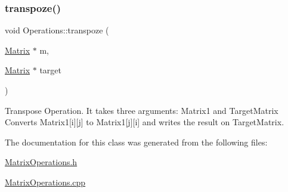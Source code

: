 \subsubsection{\texorpdfstring{transpoze()}{transpoze()}}
{\footnotesize\ttfamily void Operations\+::transpoze (\begin{DoxyParamCaption}\item[{\hyperlink{class_matrix}{Matrix} $\ast$}]{m,  }\item[{\hyperlink{class_matrix}{Matrix} $\ast$}]{target }\end{DoxyParamCaption})}

Transpose Operation. It takes three arguments\+: Matrix1 and Target\+Matrix Converts Matrix1\mbox{[}i\mbox{]}\mbox{[}j\mbox{]} to Matrix1\mbox{[}j\mbox{]}\mbox{[}i\mbox{]} and writes the result on Target\+Matrix. 

The documentation for this class was generated from the following files\+:\begin{DoxyCompactItemize}
\item 
\hyperlink{_matrix_operations_8h}{Matrix\+Operations.\+h}\item 
\hyperlink{_matrix_operations_8cpp}{Matrix\+Operations.\+cpp}\end{DoxyCompactItemize}
